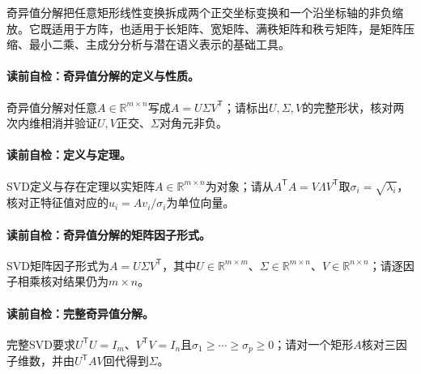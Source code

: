\label{struct:V4-C03-CH06}
奇异值分解把任意矩形线性变换拆成两个正交坐标变换和一个沿坐标轴的非负缩放。它既适用于方阵，也适用于长矩阵、宽矩阵、满秩矩阵和秩亏矩阵，是矩阵压缩、最小二乘、主成分分析与潜在语义表示的基础工具。

\paragraph{读前自检：奇异值分解的定义与性质。}奇异值分解对任意$A\in\mathbb R^{m\times n}$写成$A=U\Sigma V^{\mathsf T}$；请标出$U,\Sigma,V$的完整形状，核对两次内维相消并验证$U,V$正交、$\Sigma$对角元非负。\par
\paragraph{读前自检：定义与定理。}SVD定义与存在定理以实矩阵$A\in\mathbb R^{m\times n}$为对象；请从$A^{\mathsf T}A=V\Lambda V^{\mathsf T}$取$\sigma_i=\sqrt{\lambda_i}$，核对正特征值对应的$u_i=Av_i/\sigma_i$为单位向量。\par
\paragraph{读前自检：奇异值分解的矩阵因子形式。}SVD矩阵因子形式为$A=U\Sigma V^{\mathsf T}$，其中$U\in\mathbb R^{m\times m}$、$\Sigma\in\mathbb R^{m\times n}$、$V\in\mathbb R^{n\times n}$；请逐因子相乘核对结果仍为$m\times n$。\par

\label{struct:V4-C03-CH07}
\paragraph{读前自检：完整奇异值分解。}完整SVD要求$U^{\mathsf T}U=I_m$、$V^{\mathsf T}V=I_n$且$\sigma_1\ge\cdots\ge\sigma_p\ge0$；请对一个矩形$A$核对三因子维数，并由$U^{\mathsf T}AV$回代得到$\Sigma$。\par


